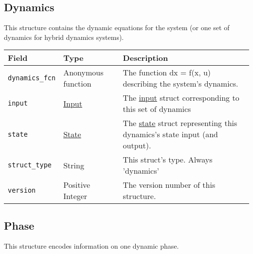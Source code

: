 \documentclass{article}
\begin{document}
		\subsection{Dynamics}
			\label{sec:dynamics} %

			This structure contains the dynamic equations for the system (or one set of dynamics for hybrid dynamics systems).\nopagebreak

			\vspace{\baselineskip}\nopagebreak

			\begin{tabular}{ p{} | p{} | p{}}
				Field                    & Type                               & Description                                      \\ \hline
				\lstinline|dynamics_fcn| & \raggedright Anonymous function    & The function dx = f(x, u) describing the system's
				                                                                dynamics.                                        \\[1ex]
				\lstinline|input|        & \hyperref[sec:input]{Input}        & The \hyperref[sec:input]{input} struct corresponding
				                                                                to this set of dynamics                          \\[1ex]
				\lstinline|state|        & \hyperref[sec:state]{State}        & The \hyperref[sec:state]{state} struct representing
				                                                                this dynamics's state input (and output).        \\[1ex]
				\lstinline|struct_type|  & String                             & This struct's type. Always 'dynamics'            \\[1ex]
				\lstinline|version|      & \raggedright Positive Integer      & The version number of this structure.
			\end{tabular}

		\subsection{Phase}
			\label{sec:phase} %

			This structure encodes information on one dynamic phase.

			\vspace{\baselineskip}
\end{document}
